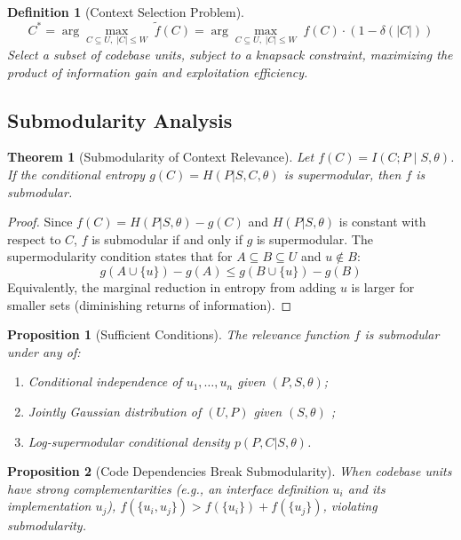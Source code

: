 \documentclass[11pt, a4paper, copyright]{googledeepmind}
\newtheorem{definition}{Definition}[section]
\newtheorem{theorem}{Theorem}[section]
\newtheorem{proposition}{Proposition}[section]
\begin{document}
\begin{definition}[Context Selection Problem]
\label{def:csp}
$$C^* = \arg\max_{C \subseteq U,\; |C| \leq W} \; \tilde{f}(C) = \arg\max_{C \subseteq U,\; |C| \leq W} \; f(C) \cdot (1 - \delta(|C|))$$
Select a subset of codebase units, subject to a knapsack constraint, maximizing the product of information gain and exploitation efficiency.
\end{definition}

\subsection{Submodularity Analysis}

\begin{theorem}[Submodularity of Context Relevance]
\label{thm:submodularity}
Let $f(C) = I(C; P \mid S, \theta)$. If the conditional entropy $g(C) = H(P|S,C,\theta)$ is supermodular, then $f$ is submodular.
\end{theorem}

\begin{proof}
Since $f(C) = H(P|S,\theta) - g(C)$ and $H(P|S,\theta)$ is constant with respect to $C$, $f$ is submodular if and only if $g$ is supermodular. The supermodularity condition states that for $A \subseteq B \subseteq U$ and $u \notin B$:
$$g(A \cup \{u\}) - g(A) \leq g(B \cup \{u\}) - g(B)$$
Equivalently, the marginal reduction in entropy from adding $u$ is larger for smaller sets (diminishing returns of information).
\end{proof}

\begin{proposition}[Sufficient Conditions]
\label{prop:sufficient}
The relevance function $f$ is submodular under any of:
\begin{enumerate}[nosep,label=(\alph*)]
    \item Conditional independence of $u_1, \ldots, u_n$ given $(P, S, \theta)$;
    \item Jointly Gaussian distribution of $(U, P)$ given $(S, \theta)$ \citep{krause2008near};
    \item Log-supermodular conditional density $p(P, C | S, \theta)$.
\end{enumerate}
\end{proposition}

\begin{proposition}[Code Dependencies Break Submodularity]
\label{prop:break}
When codebase units have strong complementarities (e.g., an interface definition $u_i$ and its implementation $u_j$), $f(\{u_i, u_j\}) > f(\{u_i\}) + f(\{u_j\})$, violating submodularity.
\end{proposition}
\end{document}
